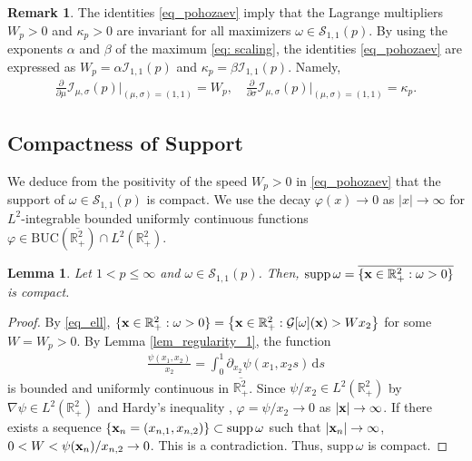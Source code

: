 \documentclass[11pt]{amsart}
\newtheorem{lemma}[theorem]{Lemma}
\theoremstyle{definition}
\theoremstyle{definition}
\newtheorem{remark}[theorem]{Remark}
\numberwithin{equation}{section}
\newcommand{\supp}{{\mathrm{supp}}\,}
\newcommand{\0}{\emptyset}
\newcommand{\bfx}{{\bf x}}
\newcommand{\bbR}{\mathbb R}
\newcommand{\calG}{\mathcal G}
\newcommand{\calI}{\mathcal I}
\newcommand{\calS}{\mathcal S}
\newcommand{\dd}{\mathrm{d}}
\begin{document}
			\begin{remark}
				The identities \eqref{eq_pohozaev} imply that the Lagrange multipliers $W_p>0$ and $\kappa_{p}>0$ are invariant for all maximizers $\omega\in \calS_{1,1}(p)$.
				By using the exponents $\alpha$ and $\beta$ of the maximum \eqref{eq: scaling}, the identities \eqref{eq_pohozaev} are expressed as $W_p=\alpha \calI_{1,1}(p)$ and $\kappa_{p}=\beta \calI_{1,1}(p)$. Namely, 
				\begin{align*}
					\frac{\partial}{\partial \mu}\calI_{\mu,\sigma}(p)\Big|_{(\mu,\sigma)=(1,1)}=W_p,\quad \frac{\partial}{\partial \sigma}\calI_{\mu,\sigma}(p)\Big|_{(\mu,\sigma)=(1,1)}=\kappa_p.
				\end{align*}
			\end{remark}
			
			
			\subsection{Compactness of  Support}
			
			
			We deduce from the positivity of the speed $W_p>0$ in \eqref{eq_pohozaev} that the support of $\omega\in \calS_{1,1}(p)$ is compact. We use the decay $\varphi(x)\to 0$ as $|x|\to\infty$ for $L^{2}$-integrable bounded uniformly continuous functions $\varphi\in \textrm{BUC}(\overline{\mathbb{R}^{2}_{+}})\cap L^{2}(\mathbb{R}^{2}_{+})$.
			
			\begin{lemma}
				\label{lem_cpt_support}
				Let $1<p\leq \infty$ and $\omega \in \calS_{1,1}(p)$. Then, $\supp \omega = \overline{ \{ \bfx \in \bbR^2_+: \omega > 0 \} }$ is compact.
			\end{lemma}
			
			\begin{proof}
				By \eqref{eq_ell}, $\{ \bfx \in \bbR^2_+: \omega > 0 \} = \left\{ \bfx \in \bbR^2_+: \calG[\omega](\bfx) > Wx_2 \right\}$ for some $W = W_p> 0$. By Lemma \ref{lem_regularity_1}, the function 
				\begin{align*}
					\frac{\psi(x_1,x_2)}{x_2}=\int_{0}^{1}\partial_{x_2}\psi(x_1,x_2s) \, \dd s
				\end{align*} 
				is bounded and uniformly continuous in $\overline{\mathbb{R}^{2}_{+}}$. Since $\psi/x_2\in L^{2}(\mathbb{R}^{2}_{+})$ by $\nabla \psi\in L^{2}(\mathbb{R}^{2}_{+})$ and Hardy's inequality \cite[2.7.1]{Mazya}, $\varphi=\psi/x_2\to 0$ as $|\bfx|\to\infty$.
				If there exists a sequence $\{\bfx_n = (x_{n, 1}, x_{n, 2})\}\subset \supp \omega$ such that $|\bfx_n|\to\infty$, $0<W<\psi(\bfx_n)/x_{n,2}\to 0$.
				This is a contradiction. Thus, $\supp \omega$ is compact.
			\end{proof}
			
\end{document}
